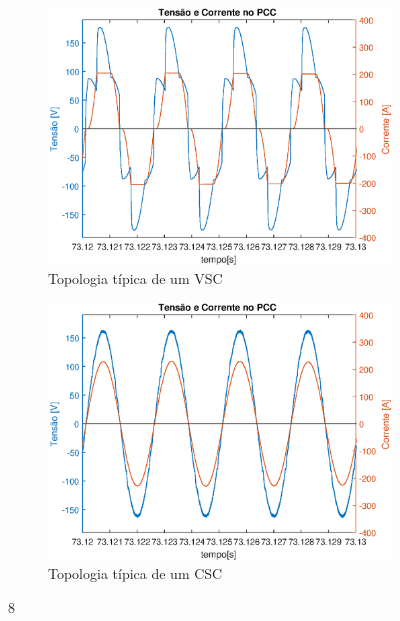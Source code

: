\begin{figure}[!htb] %
	\centering
	\begin{subfigure}[b]{0.48\textwidth}
		\centering
		\includegraphics[width=\textwidth]{Cap4/Figuras/resultados_unfilt_8.eps}
		\caption{Topologia típica de um VSC} 
		\label{fig:resultados_unfilt_8.eps}
	\end{subfigure}%
		\hfill
	\begin{subfigure}[b]{0.48\textwidth}  
		\centering 
		\includegraphics[width=\textwidth]{Cap4/Figuras/resultados_filt_8.eps}
		\caption{Topologia típica de um CSC}    
		\label{fig:resultados_filt_8.eps}
	\end{subfigure}%
	\caption{8}
	\label{fig:8}
\end{figure}

